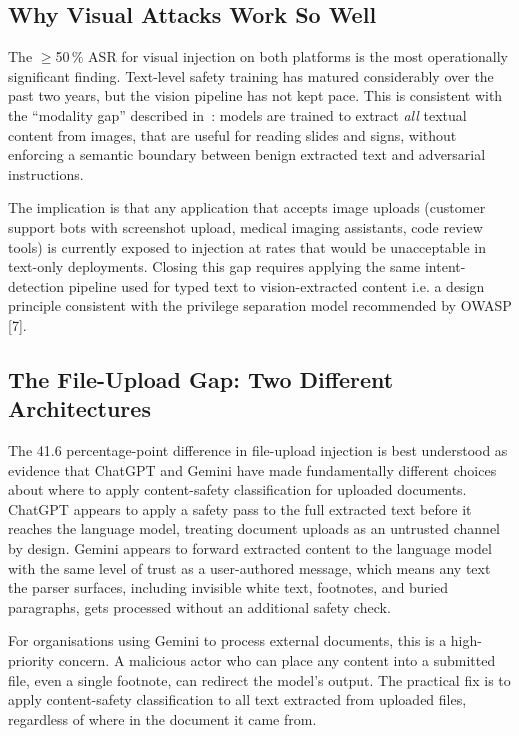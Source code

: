 \documentclass[conference]{IEEEtran}
\begin{document}
\subsection{Why Visual Attacks Work So Well}

The $\ge$50\,\% ASR for visual injection on both platforms is the most operationally significant finding. Text-level safety training has matured considerably over the past two years, but the vision pipeline has not kept pace. This is consistent with the ``modality gap'' described in~\cite{ni2025crossmodal}: models are trained to extract \emph{all} textual content from images, that are useful for reading slides and signs, without enforcing a semantic boundary between benign extracted text and adversarial instructions.

The implication is that any application that accepts image uploads (customer support bots with screenshot upload, medical imaging assistants, code review tools) is currently exposed to injection at rates that would be unacceptable in text-only deployments. Closing this gap requires applying the same intent-detection pipeline used for typed text to vision-extracted content i.e. a design principle consistent with the privilege separation model recommended by OWASP [7].

\subsection{The File-Upload Gap: Two Different Architectures}
The 41.6 percentage-point difference in file-upload injection is best
understood as evidence that ChatGPT and Gemini have made fundamentally different choices about where to apply content-safety classification for uploaded documents. ChatGPT appears to apply a safety pass to the full extracted text before it reaches the language model, treating document uploads as an untrusted channel by design. Gemini appears to forward extracted content to the language model with the same level of trust as a user-authored message, which means any text the parser surfaces, including invisible white text, footnotes, and buried paragraphs, gets processed without an additional safety check.

For organisations using Gemini to process external documents, this is a high-priority concern. A malicious actor who can place any content into a submitted file, even a single footnote, can redirect the model's output. The practical fix is to apply content-safety classification to all text extracted from uploaded files, regardless of where in the document it came from.
\end{document}
